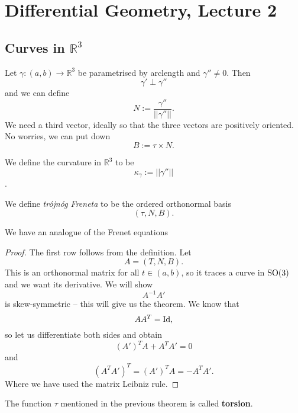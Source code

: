 \chapter{Differential Geometry, Lecture 2}

\section{Curves in \( \mathbb{R}^3 \)}

Let \( \gamma: (a,b) \to \mathbb{R}^3 \) be parametrised by arclength and \( \gamma'' \neq 0 \). Then
\[ 
    \gamma' \perp \gamma'' 
\]
and we can define
\[ 
    N := \frac{ \gamma'' }{ \left \lvert\lvert \gamma'' \right\rvert\rvert  }.
\]
We need a third vector, ideally so that the three vectors are positively oriented. No worries, we can put down
\[ 
    B := \tau \times N. 
\]

\begin{defn}
    We define the curvature in \( \mathbb{R}^3 \) to be
    \[ 
       \kappa_\gamma := \left \lvert\lvert \gamma'' \right\rvert\rvert  
   \].
\end{defn}

\begin{defn}
    We define \emph{trójnóg Freneta} to be the ordered orthonormal basis
    \[ 
        (\tau, N, B).
   \]
\end{defn}

We have an analogue of the Frenet equations

\begin{proof}
The first row follows from the definition. Let
\[ 
    A = (T,N,B). 
\]
This is an orthonormal matrix for all \( t \in (a,b) \), so it traces a curve in \( \operatorname{SO}(3) \) and we want its derivative. We will show
\[ 
    A^{-1}  A'
\]
is skew-symmetric -- this will give us the theorem. We know that
\[ 
   AA^T = \operatorname{Id},
\]
so let us differentiate both sides and obtain
\[ 
    (A')^TA + A^TA' = 0
\]
and
\[ 
    (A^TA')^T = (A')^TA = -A^TA'. 
\]
Where we have used the matrix Leibniz rule.
\end{proof}

\begin{defn}
    The function \( \tau \) mentioned in the previous theorem is called \textbf{torsion}.
\end{defn}

